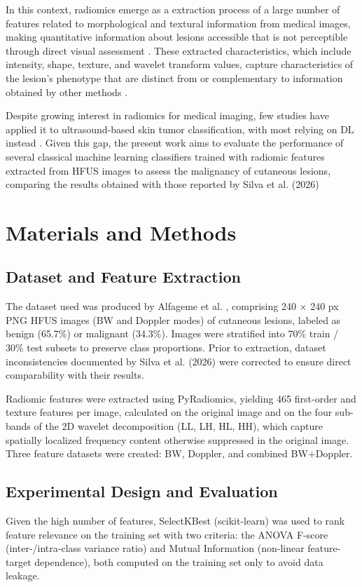 \documentclass[12pt]{article}
\begin{document}
In this context, radiomics emerge as a extraction process of a large number of features related to morphological and textural information from medical images, making quantitative information about lesions accessible that is not perceptible through direct visual assessment \cite{Lambin2017}. These extracted characteristics, which include intensity, shape, texture, and wavelet transform values, capture characteristics of the lesion's phenotype that are distinct from or complementary to information obtained by other methods \cite{Lambin2017}.

Despite growing interest in radiomics for medical imaging, few studies have applied it to ultrasound-based skin tumor classification, with most relying on DL instead \cite{Surkov2024, Bibi2026, Czajkowska2021-2}. Given this gap, the present work aims to evaluate the performance of several classical machine learning classifiers trained with
radiomic features extracted from HFUS images to assess the malignancy of
cutaneous lesions, comparing the results obtained with those reported by Silva
et al. (2026)

\section{Materials and Methods}
\subsection{Dataset and Feature Extraction}
The dataset used was produced by Alfageme et al. \cite{Alfageme2022}, comprising 240 $\times$ 240 px PNG HFUS images (BW and Doppler modes) of cutaneous lesions, labeled as benign (65.7\%) or malignant (34.3\%). Images were stratified into 70\% train / 30\% test subsets to preserve class proportions. Prior to extraction, dataset inconsistencies documented by Silva et al. (2026) were corrected to ensure direct comparability with their results.

Radiomic features were extracted using PyRadiomics, yielding 465 first-order and texture features per image, calculated on the original image and on the four sub-bands of the 2D wavelet decomposition (LL, LH, HL, HH), which capture spatially localized frequency content otherwise suppressed in the original image. Three feature datasets were created: BW, Doppler, and combined BW+Doppler.

\subsection{Experimental Design and Evaluation}
Given the high number of features, SelectKBest (scikit-learn) was used to rank feature relevance on the training set with two criteria: the ANOVA F-score (inter-/intra-class variance ratio) and Mutual Information (non-linear feature-target dependence), both computed on the training set only to avoid data leakage.
\end{document}
